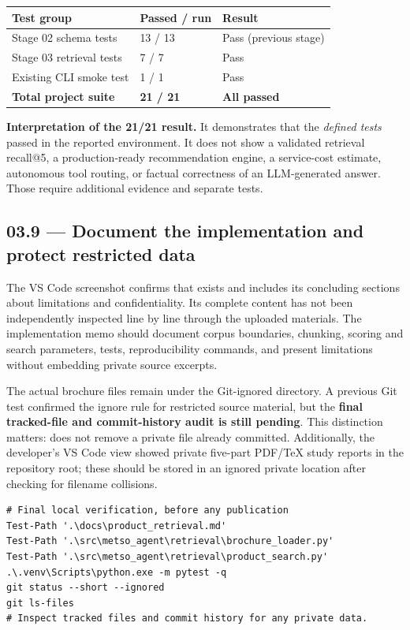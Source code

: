 \documentclass[11pt,a4paper]{article}
\DeclareRobustCommand{\code}[1]{{\ttfamily\small\detokenize{#1}}}
\begin{document}
\begin{tabularx}{\textwidth}{@{}L{73mm}L{35mm}Y@{}}
\toprule\textbf{Test group} & \textbf{Passed / run} & \textbf{Result}\\
\midrule
Stage 02 schema tests & 13 / 13 & Pass (previous stage)\\
Stage 03 retrieval tests & 7 / 7 & Pass\\
Existing CLI smoke test & 1 / 1 & Pass\\
\midrule
\textbf{Total project suite} & \textbf{21 / 21} & \textbf{All passed}\\
\bottomrule
\end{tabularx}

\begin{keybox}
\textbf{Interpretation of the 21/21 result.} It demonstrates that the \emph{defined tests} passed in the reported environment. It does not show a validated retrieval recall@5, a production-ready recommendation engine, a service-cost estimate, autonomous tool routing, or factual correctness of an LLM-generated answer. Those require additional evidence and separate tests.
\end{keybox}

\subsection{03.9 --- Document the implementation and protect restricted data}
The VS Code screenshot confirms that \code{docs/product_retrieval.md} exists and includes its concluding sections about limitations and confidentiality. Its complete content has not been independently inspected line by line through the uploaded materials. The implementation memo should document corpus boundaries, chunking, scoring and search parameters, tests, reproducibility commands, and present limitations without embedding private source excerpts.

The actual brochure files remain under the Git-ignored \code{raw/} directory. A previous Git test confirmed the ignore rule for restricted source material, but the \textbf{final tracked-file and commit-history audit is still pending}. This distinction matters: \code{.gitignore} does not remove a private file already committed. Additionally, the developer's VS Code view showed private five-part PDF/TeX study reports in the repository root; these should be stored in an ignored private location after checking for filename collisions.

\begin{Verbatim}[fontsize=\footnotesize]
# Final local verification, before any publication
Test-Path '.\docs\product_retrieval.md'
Test-Path '.\src\metso_agent\retrieval\brochure_loader.py'
Test-Path '.\src\metso_agent\retrieval\product_search.py'
.\.venv\Scripts\python.exe -m pytest -q
git status --short --ignored
git ls-files
# Inspect tracked files and commit history for any private data.
\end{Verbatim}
\end{document}
